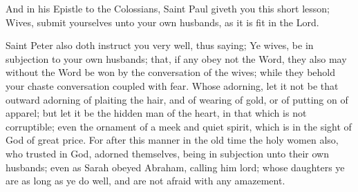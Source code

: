 And in his Epistle to the Colossians, Saint Paul giveth you this short lesson; Wives, submit yourselves unto your own husbands, as it is fit in the Lord.

Saint Peter also doth instruct you very well, thus saying; Ye wives, be in subjection to your own husbands; that, if any obey not the Word, they also may without the Word be won by the conversation of the wives; while they behold your chaste conversation coupled with fear. Whose adorning, let it not be that outward adorning of plaiting the hair, and of wearing of gold, or of putting on of apparel; but let it be the hidden man of the heart, in that which is not corruptible; even the ornament of a meek and quiet spirit, which is in the sight of God of great price. For after this manner in the old time the holy women also, who trusted in God, adorned themselves, being in subjection unto their own husbands; even as Sarah obeyed Abraham, calling him lord; whose daughters ye are as long as ye do well, and are not afraid with any amazement.

\fleuron